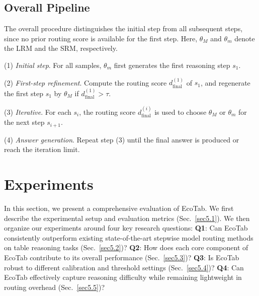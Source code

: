\documentclass[11pt]{article}
\begin{document}
\subsection{Overall Pipeline}
The overall procedure distinguishes the initial step from all subsequent steps, since no prior routing score is available for the first step. Here, $\theta_M$ and $\theta_m$ denote the LRM and the SRM, respectively.

(1) \textit{Initial step}. For all samples, $\theta_m$ first generates the first reasoning step $s_1$.

(2) \textit{First-step refinement}. Compute the routing score $d_{\text{final}}^{(1)}$ of $s_1$, and regenerate the first step $s_1$ by $\theta_M$ if $d_{\text{final}}^{(1)} > \tau$.

(3) \textit{Iterative}. For each $s_i$, the routing score $d_{\text{final}}^{(i)}$ is used to choose $\theta_M$ or $\theta_m$ for the next step $s_{i+1}$.

(4) \textit{Answer generation}. Repeat step (3) until the final answer is produced or reach the iteration limit.

\vspace{-4pt}

\section{Experiments}
\label{sec:exp}

\vspace{-4pt}
In this section, we present a comprehensive evaluation of EcoTab. We first describe the experimental setup and evaluation metrics (Sec.~\ref{sec5.1}). We then organize our experiments around four key research questions: \textbf{Q1}: Can EcoTab consistently outperform existing state-of-the-art stepwise model routing methods on table reasoning tasks (Sec.~\ref{sec5.2})? \textbf{Q2}: How does each core component of EcoTab contribute to its overall performance (Sec.~\ref{sec5.3})? \textbf{Q3}: Is EcoTab robust to different calibration and threshold settings (Sec.~\ref{sec5.4})? \textbf{Q4}: Can EcoTab effectively capture reasoning difficulty while remaining lightweight in routing overhead (Sec.~\ref{sec5.5})?

\end{document}
